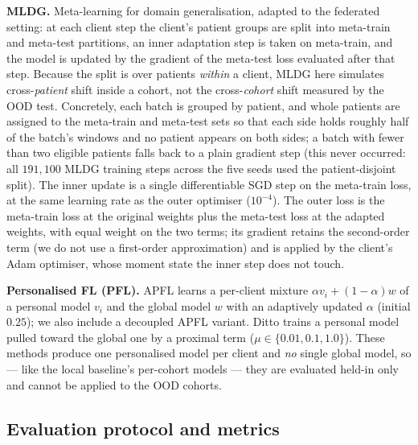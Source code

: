 \documentclass[10pt,letterpaper]{article}
\begin{document}
\textbf{MLDG.} Meta-learning for domain generalisation, adapted to the federated
setting: at each client step the client's patient groups are split into
meta-train and meta-test partitions, an inner adaptation step is taken on
meta-train, and the model is updated by the gradient of the meta-test loss
evaluated after that step. Because the split is over patients \emph{within} a
client, MLDG here simulates cross-\emph{patient} shift inside a cohort, not the
cross-\emph{cohort} shift measured by the OOD test. Concretely, each batch
is grouped by patient, and whole patients are assigned to the meta-train and
meta-test sets so that each side holds roughly half of the batch's windows and no
patient appears on both sides; a batch with fewer than two eligible patients
falls back to a plain gradient step (this never occurred: all $191{,}100$ MLDG
training steps across the five seeds used the patient-disjoint split). The inner
update is a single differentiable SGD step on the meta-train loss, at the same
learning rate as the outer optimiser ($10^{-4}$). The outer loss is the
meta-train loss at the original weights plus the meta-test loss at the adapted
weights, with equal weight on the two terms; its gradient retains the
second-order term (we do not use a first-order approximation) and is applied by
the client's Adam optimiser, whose moment state the inner step does not touch.

\textbf{Personalised FL (PFL).} APFL learns a per-client mixture
$\alpha v_i + (1-\alpha)w$ of a personal model $v_i$ and the global model $w$
with an adaptively updated $\alpha$ (initial $0.25$); we also include a decoupled
APFL variant. Ditto trains a personal model pulled toward the global one by a
proximal term ($\mu\in\{0.01,0.1,1.0\}$). These methods produce one personalised
model per client and \emph{no} single global model, so --- like the local
baseline's per-cohort models --- they are evaluated held-in only and cannot be
applied to the OOD cohorts.

\subsection*{Evaluation protocol and metrics}
\end{document}
